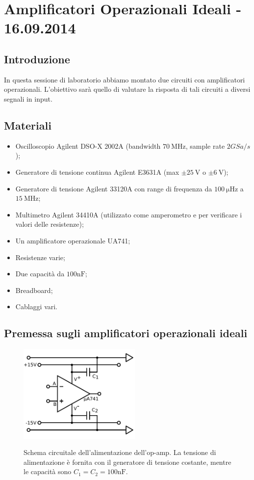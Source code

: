 \section{Amplificatori Operazionali Ideali - 16.09.2014}

\subsection{Introduzione}

In questa sessione di laboratorio abbiamo montato due circuiti con amplificatori operazionali. L'obiettivo sarà quello di valutare la risposta di tali circuiti a diversi segnali in input.

\subsection{Materiali}

\begin{itemize} [noitemsep]
\item Oscilloscopio Agilent DSO-X 2002A (bandwidth $\SI{70}{\mega\hertz}$, sample rate $2 GSa/s$);
\item Generatore di tensione continua Agilent E3631A (max $\pm \SI{25}{\volt}$ o $\pm \SI{6}{\volt}$);
\item Generatore di tensione Agilent 33120A con range di frequenza da $\SI{100}{\micro\hertz}$ a $\SI{15}{\mega\hertz}$;
\item Multimetro Agilent 34410A (utilizzato come amperometro e per verificare i valori delle resistenze);
\item Un amplificatore operazionale UA741;
\item Resistenze varie;  
\item Due capacità da $100 \si{\nano\farad}$;
\item Breadboard;
\item Cablaggi vari.
\end{itemize}

\subsection{Premessa sugli amplificatori operazionali ideali}

\begin{figure}
 \centering
   {\includegraphics[width=6cm]{../E01/latex/alimentazione.pdf}}
 \caption{Schema circuitale dell'alimentazione dell'op-amp. La tensione di alimentazione è fornita con il generatore di tensione costante, mentre le capacità sono $C_1=C_2=100 \si{\nano\farad}$.}
 \label{gr:costante}
\end{figure}

